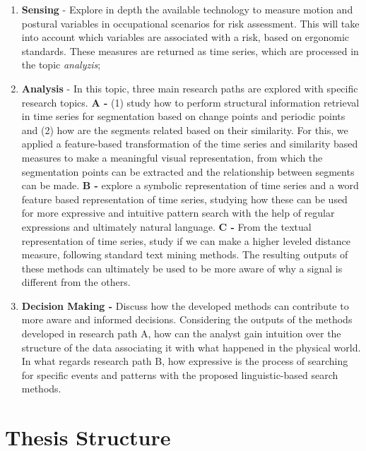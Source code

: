 \begin{enumerate}

\item \textbf{Sensing} - Explore in depth the available technology to measure motion and postural variables in occupational scenarios for risk assessment. This will take into account which variables are associated with a risk, based on ergonomic standards. These measures are returned as time series, which are processed in the topic \textit{analyzis};

\item \textbf{Analysis} - In this topic, three main research paths are explored with specific research topics. \textbf{A -} (1) study how to perform structural information retrieval in time series for segmentation based on change points and periodic points and (2) how are the segments related based on their similarity. For this, we applied a feature-based transformation of the time series and similarity based measures to make a meaningful visual representation, from which the segmentation points can be extracted and the relationship between segments can be made. \textbf{B -} explore a symbolic representation of time series and a word feature based representation of time series, studying how these can be used for more expressive and intuitive pattern search with the help of regular expressions and ultimately natural language. \textbf{C -} From the textual representation of time series, study if we can make a higher leveled distance measure, following standard text mining methods. The resulting outputs of these methods can ultimately be used to be more aware of why a signal is different from the others.

\item \textbf{Decision Making -} Discuss how the developed methods can contribute to more aware and informed decisions. Considering the outputs of the methods developed in research path A, how can the analyst gain intuition over the structure of the data associating it with what happened in the physical world. In what regards research path B, how expressive is the process of searching for specific events and patterns with the proposed linguistic-based search methods.

\end{enumerate}

\section{Thesis Structure}
\label{sec:structure}


